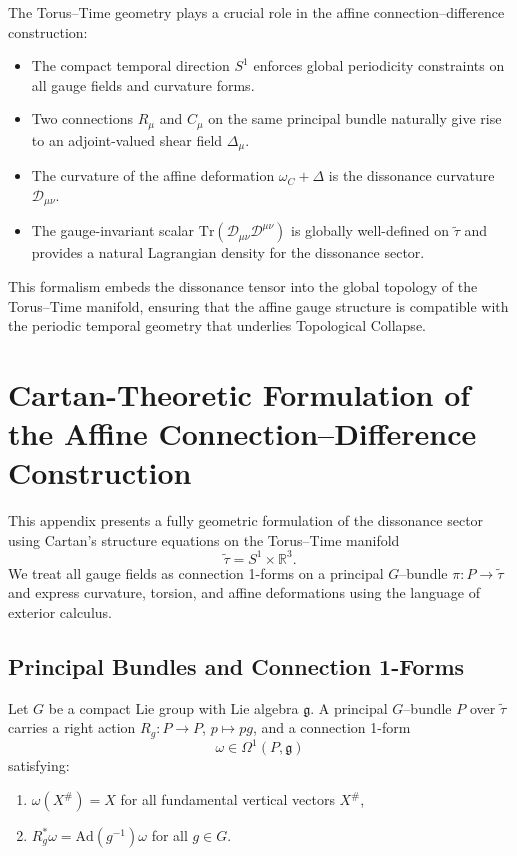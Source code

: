\documentclass[12pt,openany]{book}
\theoremstyle{plain}
\theoremstyle{definition}
\theoremstyle{remark}
\begin{document}
The Torus--Time geometry plays a crucial role in the affine
connection--difference construction:

\begin{itemize}
    \item The compact temporal direction $S^1$ enforces global periodicity
    constraints on all gauge fields and curvature forms.
    \item Two connections $R_\mu$ and $C_\mu$ on the same principal bundle
    naturally give rise to an adjoint-valued shear field $\Delta_\mu$.
    \item The curvature of the affine deformation $\omega_C + \Delta$ is the
    dissonance curvature $\mathcal{D}_{\mu\nu}$.
    \item The gauge-invariant scalar
    $\mathrm{Tr}(\mathcal{D}_{\mu\nu}\mathcal{D}^{\mu\nu})$ is globally
    well-defined on $\tilde{\tau}$ and provides a natural Lagrangian density
    for the dissonance sector.
\end{itemize}

This formalism embeds the dissonance tensor into the global topology of the
Torus--Time manifold, ensuring that the affine gauge structure is compatible
with the periodic temporal geometry that underlies Topological Collapse.

\section{Cartan-Theoretic Formulation of the Affine Connection--Difference Construction}

This appendix presents a fully geometric formulation of the dissonance
sector using Cartan's structure equations on the Torus--Time manifold
\[
\tilde{\tau} = S^1 \times \mathbb{R}^3.
\]
We treat all gauge fields as connection 1-forms on a principal $G$--bundle
$\pi : P \to \tilde{\tau}$ and express curvature, torsion, and affine
deformations using the language of exterior calculus.

\subsection*{Principal Bundles and Connection 1-Forms}

Let $G$ be a compact Lie group with Lie algebra $\mathfrak{g}$. A principal
$G$--bundle $P$ over $\tilde{\tau}$ carries a right action
$R_g : P \to P$, $p \mapsto p g$, and a connection 1-form
\[
\omega \in \Omega^1(P,\mathfrak{g})
\]
satisfying:

\begin{enumerate}
    \item $\omega(X^\#) = X$ for all fundamental vertical vectors $X^\#$,
    \item $R_g^* \omega = \mathrm{Ad}(g^{-1}) \omega$ for all $g \in G$.
\end{enumerate}
\end{document}
